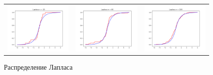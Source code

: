 	\begin{figure}[H]
		\centering
		\begin{tabular}{ccc}
			\includegraphics[width=55mm, height =0.25\textheight]{pics/emp_l_20.png}
			&
			\includegraphics[width=55mm, height =0.25\textheight]{pics/emp_l_60.png}
			&
			\includegraphics[width=55mm, height =0.25\textheight]{pics/emp_l_100.png}
		\end{tabular}
		\caption{Распределение Лапласа}
		\label{fig:laplace}
	\end{figure}


